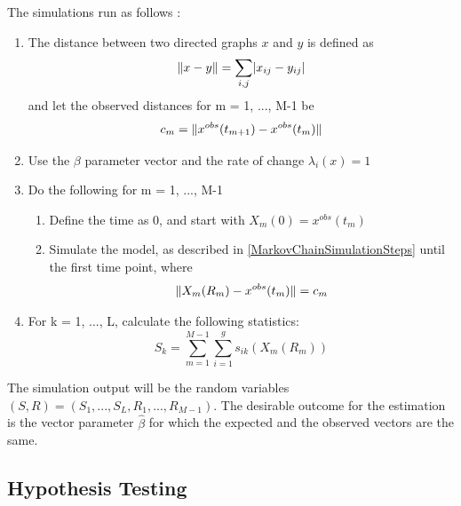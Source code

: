 \documentclass[11pt]{report}
\DeclarePairedDelimiter{\abs}{\lvert}{\rvert}
\DeclarePairedDelimiter{\norm}{\lVert}{\rVert}
\begin{document}
The simulations run as follows \cite{Snijders2004}:
\begin{enumerate}
\item The distance between two directed graphs $x$ and $y$ is defined as
\begin{equation}
\norm{x -y} = \sum_{i,j}\abs{x_{ij} - y_{ij}}
\end{equation}
and let the observed distances for m = 1, ..., M-1 be 
\begin{equation}
c_m = \norm{x^{obs}(t_{m+1})-x^{obs}(t_m)}
\end{equation}
\item Use the $\beta$ parameter vector and the rate of change $\lambda_{i}(x) = 1$

\item Do the following for m = 1, ..., M-1
\begin{enumerate}
\item Define the time as 0, and start with $X_m(0) = x^{obs}(t_m)$
\item Simulate the model, as described in \ref{MarkovChainSimulationSteps} until the first time point, where 
\begin{equation}
\norm{X_m(R_m) - x^{obs}(t_m)} = c_m
\end{equation}
\end{enumerate}
\item For k = 1, ..., L, calculate the following statistics:
\begin{equation}
S_k = \sum_{m = 1}^{M-1}\sum_{i=1}^{g}s_{ik}(X_m(R_m))
\end{equation}
\end{enumerate}

The simulation output will be the random variables $(S,R) = (S_1,...,S_L,R_1,...,R_{M-1})$. The desirable outcome for the estimation is the vector parameter $\hat{\beta}$ for which the expected and the observed vectors are the same. 

\subsection{Hypothesis Testing}














\pagebreak
\end{document}

